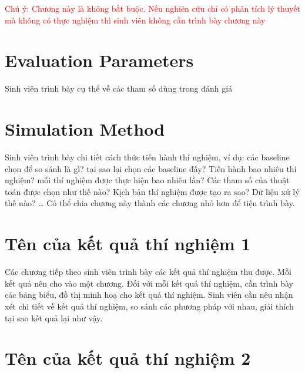 \documentclass[../main.tex]{subfiles}
\begin{document}
\textcolor{red}{Chú ý: Chương này là không bắt buộc. Nếu nghiên cứu chỉ có phân tích lý thuyết mà không có thực nghiệm thì sinh viên không cần trình bày chương này }

\section{Evaluation Parameters}

Sinh viên trình bày cụ thể về các tham số dùng trong đánh giá 

\section{Simulation Method}

Sinh viên trình bày chi tiết cách thức tiến hành thí nghiệm, ví dụ: các baseline chọn để so sánh là gì? tại sao lại chọn các baseline đấy? Tiến hành bao nhiêu thí nghiệm? mỗi thí nghiệm được thực hiện bao nhiêu lần? Các tham số của thuật toán được chọn như thế nào? Kịch bản thí nghiệm được tạo ra sao? Dữ liệu xử lý thế nào? … Có thể chia  chương này thành các chương nhỏ hơn để tiện trình bày. 

\section{Tên của kết quả thí nghiệm 1}

Các chương tiếp theo sinh viên trình bày các kết quả thí nghiệm thu được. Mỗi kết quả nên cho vào một chương. Đối với mỗi kết quả thí nghiệm, cần trình bày các bảng biểu, đồ thị minh hoạ cho kết quả thí nghiệm. Sinh viên cần nêu nhận xét chi tiết về kết quả thí nghiệm, so sánh các phương pháp với nhau, giải thích tại sao kết quả lại như vậy. 

\section{Tên của kết quả thí nghiệm 2}
\end{document}
